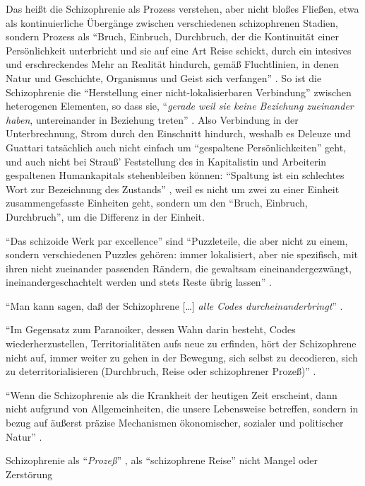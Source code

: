 \documentclass[12pt,
               DIV13,
               paper=a4,
               twoside=false,
               onehalfspacing,
               bibliography=totoc,
               toc=graduated,
               draft,
               ]{scrartcl}
\newcommand{\lips}{\dots\unkern}
\newcommand{\pc}[2]{\parencite[#1]{#2}}
\newcommand{\worries}[1]{\ifdraft{\textcolor{blue}{\texttt{(#1)}}}{}}
\begin{document}
Das heißt die Schizophrenie als Prozess verstehen, aber nicht bloßes
Fließen, etwa als kontinuierliche Übergänge zwischen verschiedenen
schizophrenen Stadien, sondern Prozess als "`Bruch, Einbruch,
Durchbruch, der die Kontinuität einer Persönlichkeit unterbricht und
sie auf eine Art Reise schickt, durch ein intesives und erschreckendes
\glq Mehr an Realität\grq{} hindurch, gemäß Fluchtlinien, in denen
Natur und Geschichte, Organismus und Geist sich verfangen"'
\pc{28}{schizg}. So ist die Schizophrenie die "`Herstellung einer
nicht-lokalisierbaren Verbindung"' \pc{19}{schizg} zwischen
heterogenen Elementen, so dass sie, "`\emph{gerade weil sie keine
Beziehung zueinander haben}, untereinander in Beziehung treten"'
\pc{19}{schizg}. Also Verbindung in der Unterbrechnung, Strom durch
den Einschnitt hindurch, weshalb es Deleuze und Guattari tatsächlich
auch nicht einfach um "`gespaltene Persönlichkeiten"' geht, und auch
nicht bei Strauß' Feststellung des in Kapitalistin und Arbeiterin
gespaltenen Humankapitals stehenbleiben können:
"`Spaltung ist ein schlechtes Wort zur Bezeichnung des Zustands"'
\pc{27}{schizg}, weil es nicht um zwei zu einer Einheit
zusammengefasste Einheiten geht, sondern um den "`Bruch, Einbruch,
Durchbruch"', um die Differenz in der Einheit.

"`Das schizoide Werk par excellence"' \pc{54}{ao} sind "`Puzzleteile,
die aber nicht zu einem, sondern verschiedenen Puzzles gehören: immer
lokalisiert, aber nie spezifisch, \worries{?} mit ihren nicht
zueinander passenden Rändern, die gewaltsam eineinandergezwängt,
ineinandergeschachtelt werden und stets Reste übrig lassen"'
\pc{54}{ao}.

"`Man kann sagen, daß der Schizophrene [\lips] \emph{alle Codes
durcheinanderbringt}"' \pc{22}{ao}.

"`Im Gegensatz zum Paranoiker, dessen Wahn darin besteht, Codes
wiederherzustellen, Territorialitäten aufs neue zu erfinden, hört der
Schizophrene nicht auf, immer weiter zu gehen in der Bewegung, sich
selbst zu decodieren, sich zu deterritorialisieren (Durchbruch, Reise
oder schizophrener Prozeß)"' \pc{28}{schizg}.

"`Wenn die Schizophrenie als die Krankheit der heutigen Zeit
erscheint, dann nicht aufgrund von Allgemeinheiten, die unsere
Lebensweise betreffen, sondern in bezug auf äußerst präzise
Mechanismen ökonomischer, sozialer und politischer Natur"' \pc{28}{schizg}.

Schizophrenie als "`\emph{Prozeß}"' \pc{27}{schizg}, als
"`schizophrene Reise"' \pc{22}{schizg} nicht Mangel oder Zerstörung
\end{document}

